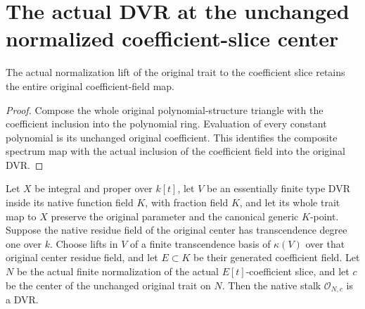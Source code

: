 \section{The actual DVR at the unchanged normalized coefficient-slice center}
\begin{lemma}\label{lem:normalized-coefficient-slice-trait-coefficients}
The actual normalization lift of the original trait to the coefficient slice retains the entire original coefficient-field map.
\leanok
\end{lemma}
\begin{proof}
Compose the whole original polynomial-structure triangle with the coefficient inclusion into the polynomial ring. Evaluation of every constant polynomial is its unchanged original coefficient. This identifies the composite spectrum map with the actual inclusion of the coefficient field into the original DVR.
\end{proof}
\begin{theorem}\label{thm:normalized-coefficient-slice-center-dvr}
Let $X$ be integral and proper over $k[t]$, let $V$ be an essentially finite type DVR inside its native function field $K$, with fraction field $K$, and let its whole trait map to $X$ preserve the original parameter and the canonical generic $K$-point. Suppose the native residue field of the original center has transcendence degree one over $k$. Choose lifts in $V$ of a finite transcendence basis of $\kappa(V)$ over that original center residue field, and let $E\subset K$ be their generated coefficient field. Let $N$ be the actual finite normalization of the actual $E[t]$-coefficient slice, and let $c$ be the center of the unchanged original trait on $N$. Then the native stalk $\mathcal O_{N,c}$ is a DVR.
\leanok
\end{theorem}
